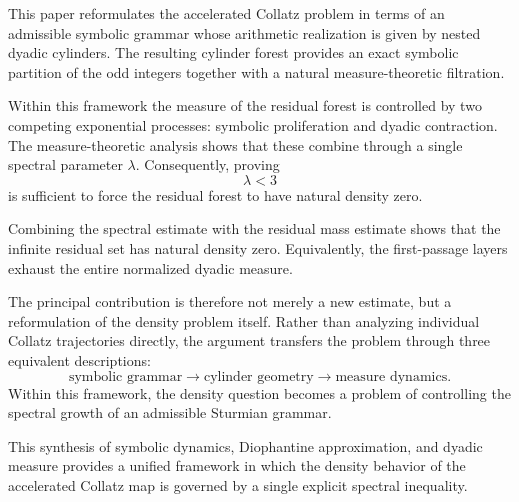 \documentclass[12pt, oneside]{article}
\numberwithin{equation}{section}
\theoremstyle{definition}
\theoremstyle{plain}
\theoremstyle{remark}
\begin{document}
This paper reformulates the accelerated Collatz problem in terms of an admissible
symbolic grammar whose arithmetic realization is given by nested dyadic cylinders.
The resulting cylinder forest provides an exact symbolic partition of the odd integers
together with a natural measure-theoretic filtration.

Within this framework the measure of the residual forest is controlled by two competing
exponential processes: symbolic proliferation and dyadic contraction. The measure-theoretic
analysis shows that these combine through a single spectral parameter $\lambda$. Consequently, proving
\[
\lambda < 3
\]
is sufficient to force the residual forest to have natural density zero.

Combining the spectral estimate with the residual mass estimate shows that the
infinite residual set has natural density zero. Equivalently, the first-passage
layers exhaust the entire normalized dyadic measure.

The principal contribution is therefore not merely a new estimate, but a reformulation
of the density problem itself. Rather than analyzing individual Collatz trajectories
directly, the argument transfers the problem through three equivalent descriptions:
\[
\text{symbolic grammar} \longrightarrow \text{cylinder geometry} \longrightarrow \text{measure dynamics}.
\]
Within this framework, the density question becomes a problem of controlling the spectral
growth of an admissible Sturmian grammar.

This synthesis of symbolic dynamics, Diophantine approximation, and dyadic measure provides
a unified framework in which the density behavior of the accelerated Collatz map is governed
by a single explicit spectral inequality.



\end{document}
